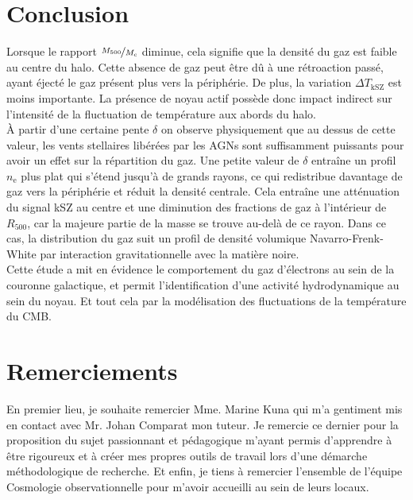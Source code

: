 \documentclass[a4paper, french, twoside, twocolumn, 11 pt]{article}
\begin{document}
\section{Conclusion}
\label{Section4}
Lorsque le rapport $\nicefrac{M_{500}}{M_\text{c}}$ diminue, cela signifie que la densité du gaz est faible au centre du halo. Cette absence de gaz peut être dû à une rétroaction passé, ayant éjecté le gaz présent plus vers la périphérie. De plus, la variation $\Delta T_\text{kSZ}$ est moins importante. La présence de noyau actif  possède donc impact indirect sur l'intensité de la fluctuation de température aux abords du halo.\\ 
À partir d'une certaine pente $\delta$ on observe physiquement que au dessus de cette valeur, les vents stellaires libérées par les AGNs sont suffisamment puissants pour avoir un effet sur la répartition du gaz.
Une petite valeur de $\delta$ entraîne un profil $n_\text{e}$ plus plat qui s'étend jusqu'à de grands rayons, ce qui redistribue davantage de gaz vers la périphérie et réduit la densité centrale.
Cela entraîne une atténuation du signal kSZ au centre et une diminution des fractions de gaz à l'intérieur de $R_{500}$, car la majeure partie de la masse se trouve au-delà de ce rayon. Dans ce cas, la distribution du gaz suit un profil de densité volumique Navarro-Frenk-White par interaction gravitationnelle avec la matière noire.\\
Cette étude a mit en évidence le comportement du gaz d'électrons au sein de la couronne galactique, et permit l'identification d'une activité hydrodynamique au sein du noyau. Et tout cela par la modélisation des fluctuations de la température du CMB.

\section*{Remerciements}
En premier lieu, je souhaite remercier Mme. Marine Kuna qui m'a gentiment mis en contact avec Mr. Johan Comparat mon tuteur. Je remercie ce dernier pour la proposition du sujet passionnant et pédagogique m'ayant permis d'apprendre à être rigoureux et à créer mes propres outils de travail lors d'une démarche méthodologique de recherche. Et enfin, je tiens à remercier l'ensemble de l'équipe Cosmologie observationnelle pour m'avoir accueilli au sein de leurs locaux.

\medskip
\printbibliography[
title={Références}
]
\newpage
\appendix
\appendixpage
\end{document}
